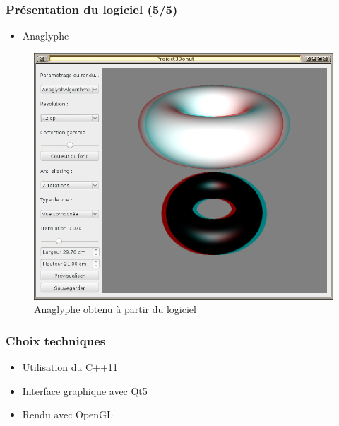 \documentclass{beamer}
\begin{document}
%
\begin{frame}
\frametitle{Présentation du logiciel (5/5)}
\begin{itemize}[label=$\bullet$]
\item Anaglyphe
\end{itemize}
\begin{figure}
\centering
\includegraphics[scale=0.28]{renduanaglyphe.png}
\caption{Anaglyphe obtenu à partir du logiciel}
\end{figure}
\end{frame}



\begin{frame}
\frametitle{Choix techniques}
\begin{itemize}[label=$\bullet$]
	\item Utilisation du C++11
	\item Interface graphique avec Qt5
	\item Rendu avec OpenGL
\end{itemize}

\end{frame}

\end{document}
